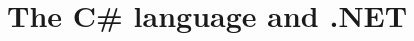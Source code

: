 \documentclass[a4paper,12pt]{article}
\begin{document}


\section{The C\# language and .NET} \label{sec:the-csharp-language}
\end{document}
